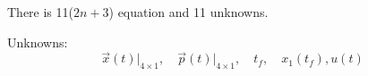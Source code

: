 There is 11($2n+3$)  equation and 11 unknowns.



Unknowns:
$$\vec{x}(t)\vert_{4\times 1}, \quad \vec{p}(t)\vert_{4\times 1},\quad t_f, \quad x_1(t_f), u(t)$$
